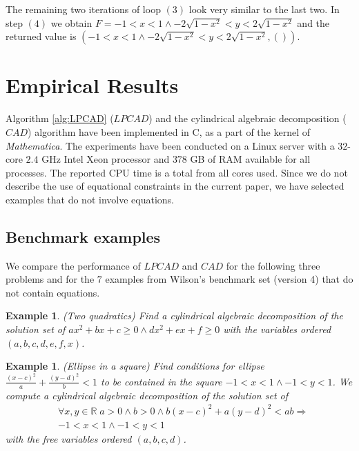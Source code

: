\documentclass[english]{amsart}
\numberwithin{equation}{section}
\numberwithin{figure}{section}
\newtheorem{example}[thm]{Example}
\begin{document}
The remaining two iterations of loop $(3)$ look very similar to the
last two. In step $(4)$ we obtain $F=-1<x<1\wedge-2\sqrt{1-x^{2}}<y<2\sqrt{1-x^{2}}$
and the returned value is $(-1<x<1\wedge-2\sqrt{1-x^{2}}<y<2\sqrt{1-x^{2}},())$.


\section{Empirical Results}

Algorithm \ref{alg:LPCAD} ($LPCAD$) and the cylindrical algebraic
decomposition ($CAD$) algorithm have been implemented in C, as a
part of the kernel of \emph{Mathematica}. The experiments have been
conducted on a Linux server with a $32$-core $2.4$ GHz Intel Xeon
processor and $378$ GB of RAM available for all processes. The reported
CPU time is a total from all cores used. Since we do not describe
the use of equational constraints in the current paper, we have selected
examples that do not involve equations.


\subsection{Benchmark examples}

We compare the performance of $LPCAD$ and $CAD$ for the following
three problems and for the $7$ examples from Wilson's benchmark set
\cite{W2} (version 4) that do not contain equations. 
\begin{example}
\label{exa:Two-quadratics}(Two quadratics) Find a cylindrical algebraic
decomposition of the solution set of $ax^{2}+bx+c\geq0\wedge dx^{2}+ex+f\geq0$
with the variables ordered $(a,b,c,d,e,f,x)$.
\end{example}

\begin{example}
\label{exa:Ellipse in a square}(Ellipse in a square) Find conditions
for ellipse $\frac{(x-c)^{2}}{a}+\frac{(y-d)^{2}}{b}<1$ to be contained
in the square $-1<x<1\wedge-1<y<1$. We compute a cylindrical algebraic
decomposition of the solution set of\begin{eqnarray*}
 & \forall x,y\in\mathbb{R}\; a>0\wedge b>0\wedge b(x-c)^{2}+a(y-d)^{2}<ab\Rightarrow\\
 & -1<x<1\wedge-1<y<1\end{eqnarray*}
with the free variables ordered $(a,b,c,d)$.
\end{example}
\end{document}
